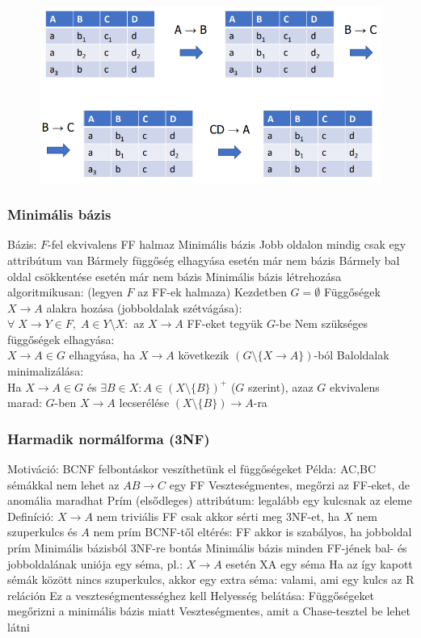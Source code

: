 \documentclass[12pt,a4paper]{article}
\begin{document}
\begin{figure}[h!]
	\centering
	\includegraphics[width=0.7\linewidth]{Chase-teszt}
\end{figure}

\pagebreak

\subsubsection{Minimális bázis}

\begin{outline}
	\1 Bázis: $F$-fel ekvivalens FF halmaz
	\1 Minimális bázis
		\2 Jobb oldalon mindig csak egy attribútum van
		\2 Bármely függőség elhagyása esetén már nem bázis
		\2 Bármely bal oldal csökkentése esetén már nem bázis
	\1 Minimális bázis létrehozása algoritmikusan: (legyen $F$ az FF-ek halmaza)
		\2 Kezdetben $G = \emptyset$
		\2 Függőségek $X \to A$ alakra hozása (jobboldalak szétvágása):\\
		$\forall \; X \to Y \in F, \; A \in Y \setminus X:$ az $X \to A$ FF-eket tegyük $G$-be
		\2 Nem szükséges függőségek elhagyása:\\
		$X \to A \in G$ elhagyása, ha $X \to A$ következik $(G \setminus \{X \to A\})$-ból
		\2 Baloldalak minimalizálása:\\
		Ha $X \to A \in G$ és $\exists B \in X: A \in (X \setminus \{B\})^+$ ($G$ szerint),
		azaz $G$ ekvivalens marad: $G$-ben $X \to A$ lecserélése $(X \setminus \{B\}) \to A$-ra
\end{outline}

\subsubsection{Harmadik normálforma (3NF)}

\begin{outline}
	\1 Motiváció: BCNF felbontáskor veszíthetünk el függőségeket
		\2 Példa: AC,BC sémákkal nem lehet az $AB \to C$ egy FF
	\1 Veszteségmentes, megőrzi az FF-eket, de anomália maradhat
	\1 Prím (elsődleges) attribútum: legalább egy kulcsnak az eleme
	\1 Definíció: $X \to A$ nem triviális FF csak akkor sérti meg 3NF-et, ha $X$ nem szuperkulcs és $A$ nem prím
		\2 BCNF-től eltérés: FF akkor is szabályos, ha jobboldal prím
	\1 Minimális bázisból 3NF-re bontás
		\2 Minimális bázis minden FF-jének bal- és jobboldalának uniója egy séma,
		pl.: $X \to A$ esetén XA egy séma
		\2 Ha az így kapott sémák között nincs szuperkulcs, akkor egy extra séma:
		valami, ami egy kulcs az R reláción
			\3 Ez a veszteségmentességhez kell
	\1 Helyesség belátása:
		\2 Függőségeket megőrizni a minimális bázis miatt
		\2 Veszteségmentes, amit a Chase-tesztel be lehet látni
\end{outline}
\end{document}

